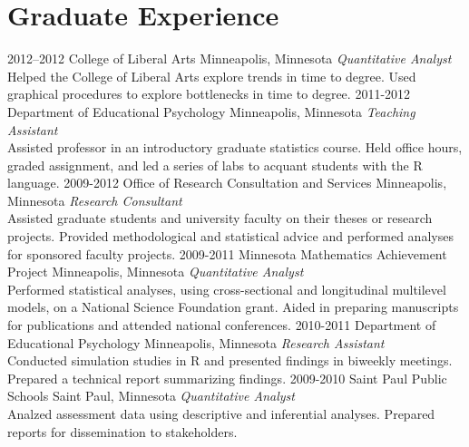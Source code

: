 \documentclass[]{friggeri-cv} %
\begin{document}
\newpage 
\section{Graduate Experience}

\begin{entrylist}
\entry
{2012--2012}
{College of Liberal Arts}
{Minneapolis, Minnesota}
{\emph{Quantitative Analyst} \\
Helped the College of Liberal Arts explore trends in time to degree. Used graphical procedures to explore bottlenecks in time to degree.}
\entry
{2011-2012}
{Department of Educational Psychology}
{Minneapolis, Minnesota}
{\emph{Teaching Assistant} \\
Assisted professor in an introductory graduate statistics course. Held office hours, graded assignment, and led a series of labs to acquant students with the R language.}
\entry
{2009-2012}
{Office of Research Consultation and Services}
{Minneapolis, Minnesota}
{\emph{Research Consultant} \\
Assisted graduate students and university faculty on their theses or research projects. Provided methodological and statistical advice and performed analyses for sponsored faculty projects.}
\entry
{2009-2011}
{Minnesota Mathematics Achievement Project}
{Minneapolis, Minnesota}
{\emph{Quantitative Analyst} \\
Performed statistical analyses, using cross-sectional and longitudinal multilevel models, on a National Science Foundation grant. Aided in preparing manuscripts for publications and attended national conferences.}
\entry
{2010-2011}
{Department of Educational Psychology}
{Minneapolis, Minnesota}
{\emph{Research Assistant} \\
Conducted simulation studies in R and presented findings in biweekly meetings.  Prepared a technical report summarizing findings.}
\entry
{2009-2010}
{Saint Paul Public Schools}
{Saint Paul, Minnesota}
{\emph{Quantitative Analyst} \\
Analzed assessment data using descriptive and inferential analyses. Prepared reports for dissemination to stakeholders.}

\end{entrylist}
\end{document}
